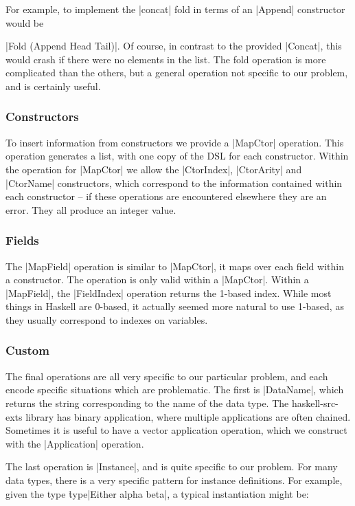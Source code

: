 \documentclass[preprint,draft]{sigplanconf}
\begin{document}
For example, to implement the |concat| fold in terms of an |Append| constructor would be \ignore|Fold (Append Head Tail)|. Of course, in contrast to the provided |Concat|, this would crash if there were no elements in the list. The fold operation is more complicated than the others, but a general operation not specific to our problem, and is certainly useful.

\subsubsection{Constructors}

To insert information from constructors we provide a |MapCtor| operation. This operation generates a list, with one copy of the DSL for each constructor. Within the operation for |MapCtor| we allow the |CtorIndex|, |CtorArity| and |CtorName| constructors, which correspond to the information contained within each constructor -- if these operations are encountered elsewhere they are an error. They all produce an integer value.

\subsubsection{Fields}

The |MapField| operation is similar to |MapCtor|, it maps over each field within a constructor. The operation is only valid within a |MapCtor|. Within a |MapField|, the |FieldIndex| operation returns the 1-based index. While most things in Haskell are 0-based, it actually seemed more natural to use 1-based, as they usually correspond to indexes on variables.

\subsubsection{Custom}

The final operations are all very specific to our particular problem, and each encode specific situations which are problematic. The first is |DataName|, which returns the string corresponding to the name of the data type. The haskell-src-exts library has binary application, where multiple applications are often chained. Sometimes it is useful to have a vector application operation, which we construct with the |Application| operation.

The last operation is |Instance|, and is quite specific to our problem. For many data types, there is a very specific pattern for instance definitions. For example, given the type \h{type}|Either alpha beta|, a typical instantiation might be:
\end{document}
